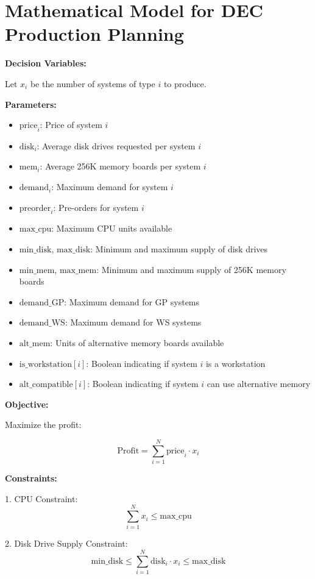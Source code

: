 \documentclass{article}
\begin{document}
\section*{Mathematical Model for DEC Production Planning}

\textbf{Decision Variables:}

Let \( x_i \) be the number of systems of type \( i \) to produce.

\textbf{Parameters:}

\begin{itemize}
    \item \( \text{price}_i \): Price of system \( i \)
    \item \( \text{disk}_i \): Average disk drives requested per system \( i \)
    \item \( \text{mem}_i \): Average 256K memory boards per system \( i \)
    \item \( \text{demand}_i \): Maximum demand for system \( i \)
    \item \( \text{preorder}_i \): Pre-orders for system \( i \)
    \item \( \text{max\_cpu} \): Maximum CPU units available
    \item \( \text{min\_disk} \), \( \text{max\_disk} \): Minimum and maximum supply of disk drives
    \item \( \text{min\_mem} \), \( \text{max\_mem} \): Minimum and maximum supply of 256K memory boards
    \item \( \text{demand\_GP} \): Maximum demand for GP systems
    \item \( \text{demand\_WS} \): Maximum demand for WS systems
    \item \( \text{alt\_mem} \): Units of alternative memory boards available
    \item \( \text{is\_workstation}[i] \): Boolean indicating if system \( i \) is a workstation
    \item \( \text{alt\_compatible}[i] \): Boolean indicating if system \( i \) can use alternative memory
\end{itemize}

\textbf{Objective:}

Maximize the profit:

\[
\text{Profit} = \sum_{i=1}^{N} \text{price}_i \cdot x_i
\]

\textbf{Constraints:}

1. CPU Constraint:
   \[
   \sum_{i=1}^{N} x_i \leq \text{max\_cpu}
   \]

2. Disk Drive Supply Constraint:
   \[
   \text{min\_disk} \leq \sum_{i=1}^{N} \text{disk}_i \cdot x_i \leq \text{max\_disk}
   \]
\end{document}
